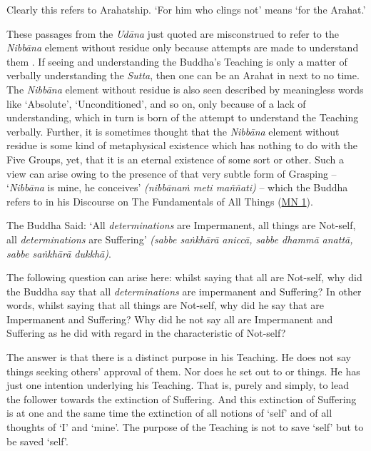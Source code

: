 Clearly this refers to Arahatship. `For him who clings not' means `for the Arahat.'

These passages from the \emph{Udāna} just quoted are misconstrued to refer to the \emph{Nibbāna} element without residue only because attempts are made to understand them . If seeing and understanding the Buddha's Teaching is only a matter of verbally understanding the \emph{Sutta}, then one can be an Arahat in next to no time. The \emph{Nibbāna} element without residue is also seen described by meaningless words like `Absolute', `Unconditioned', and so on, only because of a lack of understanding, which in turn is born of the attempt to understand the Teaching verbally. Further, it is sometimes thought that the \emph{Nibbāna} element without residue is some kind of metaphysical existence which has nothing to do with the Five Groups, yet, that it is an eternal existence of some sort or other. Such a view can arise owing to the presence of that very subtle form of Grasping -- `\emph{Nibbāna} is mine, he conceives' \emph{(nibbānaṁ meti maññati)} -- which the Buddha refers to in his Discourse on The Fundamentals of All Things (\href{https://suttacentral.net/mn1/en/bodhi}{MN 1}).

\sectionBreak

The Buddha Said: `All \emph{determinations} are Impermanent, all things are Not-self, all \emph{determinations} are Suffering' \emph{(sabbe saṅkhārā aniccā, sabbe dhammā anattā, sabbe saṅkhārā dukkhā)}.

The following question can arise here: whilst saying that all  are Not-self, why did the Buddha say that all \emph{determinations} are impermanent and Suffering? In other words, whilst saying that all things are Not-self, why did he say that  are Impermanent and Suffering? Why did he not  say all  are Impermanent and Suffering as he did with regard in the characteristic of Not-self?

The answer is that there is a distinct purpose in his Teaching. He does not say things seeking others' approval of them. Nor does he set out to  or  things. He has just one intention underlying his Teaching. That is, purely and simply, to lead the follower towards the extinction of Suffering. And this extinction of Suffering is at one and the same time the extinction of all notions of `self' and of all thoughts of `I' and `mine'. The purpose of the Teaching is not to save `self' but to be saved  `self'.

